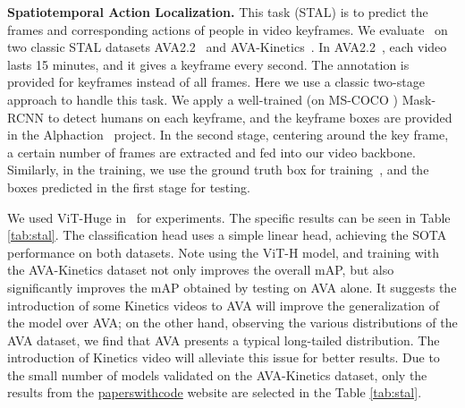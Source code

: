 \textbf{Spatiotemporal Action Localization.}
This task (STAL) is to predict the frames and corresponding actions of people in video keyframes.
We evaluate \model~on two classic STAL datasets AVA2.2~\cite{ava} and AVA-Kinetics~\cite{avakinetics}. In AVA2.2~\cite{ava}, each video lasts 15 minutes, and it gives a keyframe every second. The annotation is provided for keyframes instead of all frames. Here we use a classic two-stage approach to handle this task. We apply a well-trained (on MS-COCO \cite{lin2014microsoft}) Mask-RCNN \cite{maskrcnn} to detect humans on each keyframe, and the keyframe boxes are provided in the Alphaction~\cite{alphaction} project. In the second stage, centering around the key frame, a certain number of frames are extracted and fed into our video backbone.
Similarly, in the training, we use the ground truth box for training~\cite{alphaction}, and the boxes predicted in the first stage for testing. 


We used ViT-Huge in \model~for experiments. The specific results can be seen in Table \ref{tab:stal}. The classification head uses a simple linear head, achieving the SOTA performance on both datasets. Note using the ViT-H model, and training with the AVA-Kinetics dataset not only improves the overall mAP, but also significantly improves the mAP obtained by testing on AVA alone. It suggests the introduction of some Kinetics videos to AVA will improve the generalization of the model over AVA; on the other hand, observing the various distributions of the AVA dataset, we find that AVA presents a typical long-tailed distribution. The introduction of Kinetics video will alleviate this issue for better results. Due to the small number of models validated on the AVA-Kinetics dataset, only the results from the \href{https://paperswithcode.com/sota/spatio-temporal-action-localization-on-ava}{paperswithcode} website are selected in the Table \ref{tab:stal}.